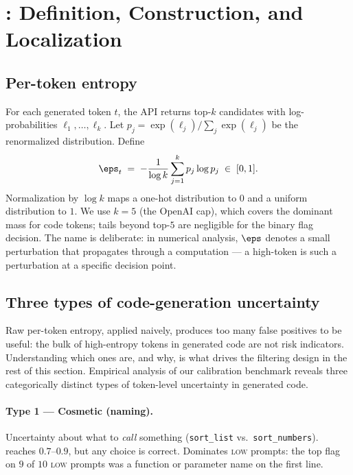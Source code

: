 \section{\eps: Definition, Construction, and Localization}
\label{sec:epsilon}

\subsection{Per-token entropy}
\label{subsec:per-token}

For each generated token $t$, the API returns top-$k$ candidates with
log-probabilities $\ell_1, \dots, \ell_k$. Let
$p_j = \exp(\ell_j) / \sum_j \exp(\ell_j)$ be the renormalized
distribution. Define
\begin{equation}
    \eps_t \;=\; -\frac{1}{\log k} \sum_{j=1}^{k} p_j \log p_j
    \;\in\; [0,1].
    \label{eq:eps}
\end{equation}
Normalization by $\log k$ maps a one-hot distribution to $0$ and a
uniform distribution to $1$. We use $k=5$ (the OpenAI cap), which
covers the dominant mass for code tokens; tails beyond top-$5$ are
negligible for the binary flag decision. The name is deliberate: in
numerical analysis, $\eps$ denotes a small perturbation that
propagates through a computation --- a high-\eps token is such a
perturbation at a specific decision point.

\subsection{Three types of code-generation uncertainty}
\label{subsec:types}

Raw per-token entropy, applied naively, produces too many false
positives to be useful: the bulk of high-entropy tokens in generated
code are not risk indicators. Understanding which ones are, and why,
is what drives the filtering design in the rest of this section.
Empirical analysis of our calibration benchmark reveals three
categorically distinct types of token-level uncertainty in generated
code.

\paragraph{Type 1 --- Cosmetic (naming).} Uncertainty about what to
\emph{call} something (\texttt{sort\_list} vs.\ \texttt{sort\_numbers}).
\eps reaches $0.7$--$0.9$, but any choice is correct. Dominates
\textsc{low} prompts: the top flag on $9$ of $10$ \textsc{low} prompts
was a function or parameter name on the first line.

